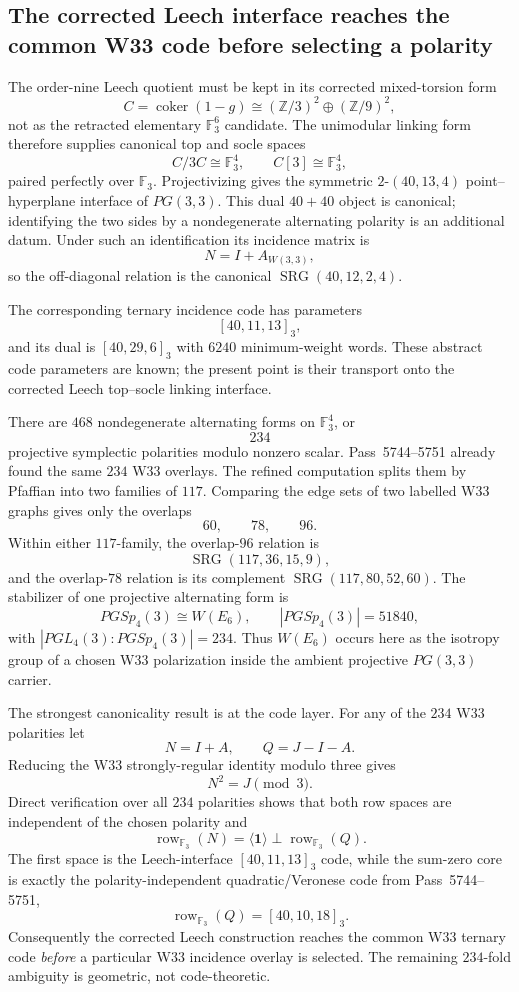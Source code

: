 \subsection{The corrected Leech interface reaches the common W33 code before selecting a polarity}

The order-nine Leech quotient must be kept in its corrected mixed-torsion form
\[
 C=\operatorname{coker}(1-g)\cong(\mathbb Z/3)^2\oplus(\mathbb Z/9)^2,
\]
not as the retracted elementary $\mathbb F_3^6$ candidate.  The unimodular linking form therefore supplies canonical top and socle spaces
\[
 C/3C\cong\mathbb F_3^4,
 \qquad C[3]\cong\mathbb F_3^4,
\]
paired perfectly over $\mathbb F_3$.  Projectivizing gives the symmetric $2$-$(40,13,4)$ point--hyperplane interface of $PG(3,3)$.  This dual $40+40$ object is canonical; identifying the two sides by a nondegenerate alternating polarity is an additional datum.  Under such an identification its incidence matrix is
\[
 N=I+A_{W(3,3)},
\]
so the off-diagonal relation is the canonical $\operatorname{SRG}(40,12,2,4)$.

The corresponding ternary incidence code has parameters
\[
 [40,11,13]_3,
\]
and its dual is $[40,29,6]_3$ with $6240$ minimum-weight words.  These abstract code parameters are known; the present point is their transport onto the corrected Leech top--socle linking interface.

There are $468$ nondegenerate alternating forms on $\mathbb F_3^4$, or
\[
 \boxed{234}
\]
projective symplectic polarities modulo nonzero scalar.  Pass~5744--5751 already found the same $234$ W33 overlays.  The refined computation splits them by Pfaffian into two families of $117$.  Comparing the edge sets of two labelled W33 graphs gives only the overlaps
\[
 60,\qquad 78,\qquad 96.
\]
Within either $117$-family, the overlap-$96$ relation is
\[
 \operatorname{SRG}(117,36,15,9),
\]
and the overlap-$78$ relation is its complement $\operatorname{SRG}(117,80,52,60)$.  The stabilizer of one projective alternating form is
\[
 PGSp_4(3)\cong W(E_6),\qquad |PGSp_4(3)|=51840,
\]
with $|PGL_4(3):PGSp_4(3)|=234$.  Thus $W(E_6)$ occurs here as the isotropy group of a chosen W33 polarization inside the ambient projective $PG(3,3)$ carrier.

The strongest canonicality result is at the code layer.  For any of the $234$ W33 polarities let
\[
 N=I+A,\qquad Q=J-I-A.
\]
Reducing the W33 strongly-regular identity modulo three gives
\[
 \boxed{N^2=J\pmod 3}.
\]
Direct verification over all $234$ polarities shows that both row spaces are independent of the chosen polarity and
\[
 \operatorname{row}_{\mathbb F_3}(N)
 =\langle\mathbf 1\rangle\perp
 \operatorname{row}_{\mathbb F_3}(Q).
\]
The first space is the Leech-interface $[40,11,13]_3$ code, while the sum-zero core is exactly the polarity-independent quadratic/Veronese code from Pass~5744--5751,
\[
 \operatorname{row}_{\mathbb F_3}(Q)=[40,10,18]_3.
\]
Consequently the corrected Leech construction reaches the common W33 ternary code \emph{before} a particular W33 incidence overlay is selected.  The remaining $234$-fold ambiguity is geometric, not code-theoretic.

